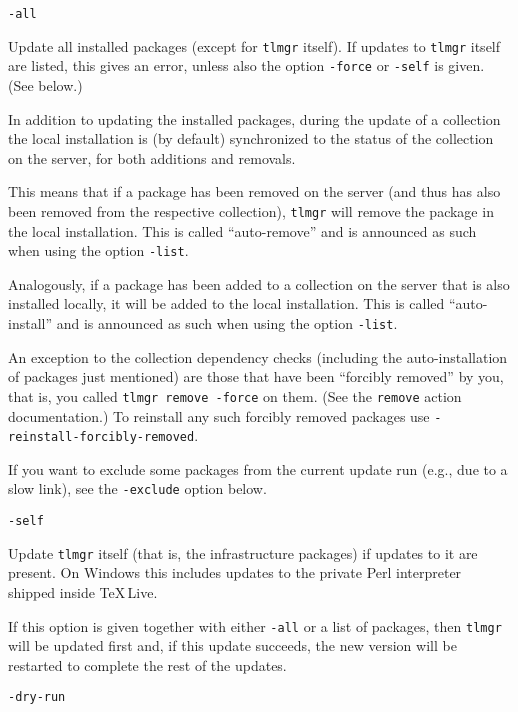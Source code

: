 \documentclass[11pt]{article}
\begin{document}
\begin{description}

\item\texttt{-all}\par 

Update all installed packages (except for \texttt{tlmgr}
itself). If updates to \texttt{tlmgr} itself are listed,
this gives an error, unless also the option \texttt{-force}
or \texttt{-self} is given. (See below.)

In addition to updating the installed packages, during
the update of a collection the local installation is (by
default) synchronized to the status of the collection on the
server, for both additions and removals.

This means that if a package has been removed on the
server (and thus has also been removed from the respective
collection), \texttt{tlmgr} will remove the package in the
local installation. This is called ``auto-remove'' and is
announced as such when using the option \texttt{-list}.

Analogously, if a package has been added to a collection
on the server that is also installed locally, it will
be added to the local installation. This is called
``auto-install'' and is announced as such when using the
option \texttt{-list}.

An exception to the collection dependency checks (including
the auto-installation of packages just mentioned) are
those that have been ``forcibly removed'' by you,
that is, you called \texttt{tlmgr remove -force} on
them. (See the \texttt{remove} action documentation.)
To reinstall any such forcibly removed packages use
\texttt{-reinstall-forcibly-removed}.

If you want to exclude some packages from the current update
run (e.g., due to a slow link), see the \texttt{-exclude}
option below.

\item\texttt{-self}\par 

Update \texttt{tlmgr} itself (that is, the infrastructure
packages) if updates to it are present. On Windows this
includes updates to the private Perl interpreter shipped
inside \TeX\,Live.

If this option is given together with either \texttt{-all}
or a list of packages, then \texttt{tlmgr} will be updated
first and, if this update succeeds, the new version will be
restarted to complete the rest of the updates.

\item\texttt{-dry-run}\par 


\end{description}
\end{document}
